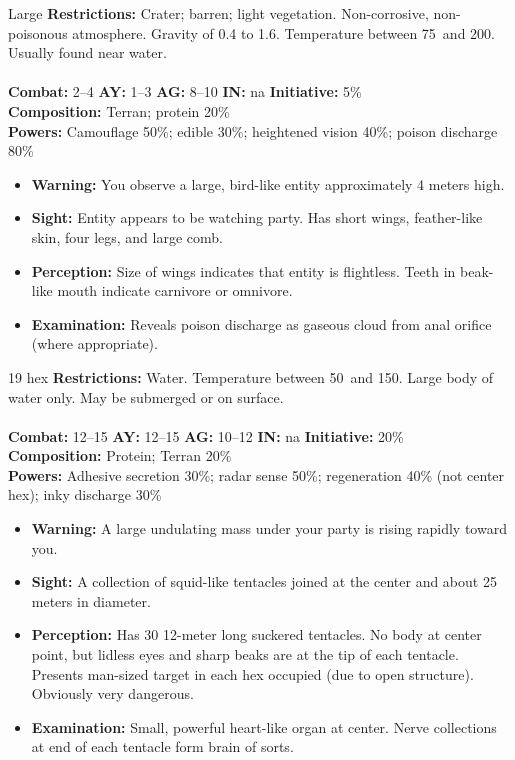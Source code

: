 \hrulefill

\begin{creature}{Large}
\textbf{Restrictions:} Crater; barren; light vegetation. Non-corrosive, non-poisonous atmosphere. Gravity of 0.4 to 1.6. Temperature between 
75\textdegree\ and 200\textdegree. Usually found near water. \\\\
\textbf{Combat:} 2--4 \textbf{AY:} 1--3 \textbf{AG:} 8--10 \textbf{IN:} na \textbf{Initiative:} 5\% \\
\textbf{Composition:} Terran; protein 20\% \\
\textbf{Powers:} Camouflage 50\%; edible 30\%; heightened vision 40\%;
poison discharge 80\% 
\begin{itemize}
\item \textbf{Warning:} You observe a large, bird-like entity approximately 4 meters high. 
\item \textbf{Sight:} Entity appears to be watching party. Has short wings, feather-like skin, four legs, and large comb. 
\item \textbf{Perception:} Size of wings indicates that entity is flightless. Teeth in beak-like mouth indicate carnivore or omnivore. 
\item \textbf{Examination:} Reveals poison discharge as gaseous cloud from anal orifice (where appropriate). 
\end{itemize}
\end{creature}

\hrulefill

\begin{creature}{19 hex}
\textbf{Restrictions:} Water. Temperature between 50\textdegree\ and 150\textdegree. Large body of water only. May be submerged or on surface. \\\\
\textbf{Combat:} 12--15 \textbf{AY:} 12--15 \textbf{AG:} 10--12 \textbf{IN:} na \textbf{Initiative:} 20\% \\
\textbf{Composition:} Protein; Terran 20\% \\
\textbf{Powers:} Adhesive secretion 30\%; radar sense 50\%; regeneration 40\% (not center hex); inky discharge 30\% 
\begin{itemize}
\item \textbf{Warning:} A large undulating mass under your party is rising rapidly toward you. 
\item \textbf{Sight:} A collection of squid-like tentacles joined at the center and about 25 meters in diameter. 
\item \textbf{Perception:} Has 30 12-meter long suckered tentacles. No body at center point, but lidless eyes and sharp beaks are at the tip of 
each tentacle. Presents man-sized target in each hex occupied (due to open structure). Obviously very dangerous. 
\item \textbf{Examination:} Small, powerful heart-like organ at center. Nerve collections at end of each tentacle form brain of sorts. 
\end{itemize}
\end{creature}

